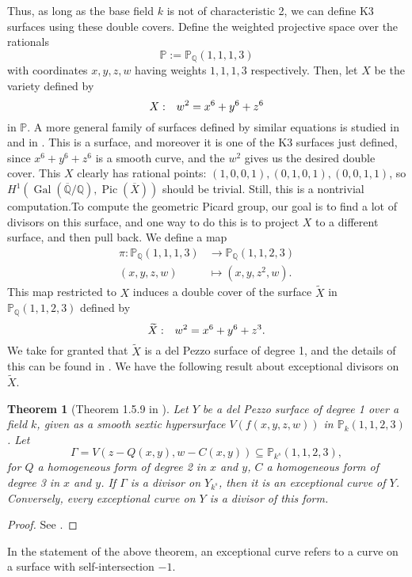 \documentclass[12pt,twoside]{reedthesis}
\theoremstyle{plain}
\newtheorem{theorem}{Theorem}[chapter]
\theoremstyle{definition}
\theoremstyle{remark}
\newcommand{\QQ}{\mathbb{Q}}
\newcommand{\Proj}{\mathbb{P}}
\newcommand{\Pic}{\operatorname{Pic}}
\newcommand{\Gal}{\operatorname{Gal}}
\begin{document}
Thus, as long as the base field $k$ is not of characteristic 2, we can define K3 surfaces using these double covers. Define the weighted projective space over the rationals
\[
\Proj:=\Proj_\QQ(1,1,1,3)
\]
with coordinates $x,y,z,w$ having weights $1,1,1,3$ respectively. Then, let $X$ be the variety defined by 
\[
X:\hspace{0.25cm} w^2=x^6+y^6+z^6
\]
in $\Proj$. A more general family of surfaces defined by similar equations is studied in \cite{mckPaper} and in \cite{festiThesis}. This is a surface, and moreover it is one of the K3 surfaces just defined, since $x^6+y^6+z^6$ is a smooth curve, and the $w^2$ gives us the desired double cover. This $X$ clearly has rational points: $(1,0,0,1), (0,1,0,1), (0,0,1,1)$, so $H^1(\Gal(\overline{\QQ}/\QQ),\Pic(\overline{X}))$ should be trivial. Still, this is a nontrivial computation.To compute the geometric Picard group, our goal is to find a lot of divisors on this surface, and one way to do this is to project $X$ to a different surface, and then pull back. We define a map
\begin{align*}
\pi:\Proj_\QQ(1,1,1,3)&\to\Proj_\QQ(1,1,2,3)\\
(x,y,z,w)&\mapsto(x,y,z^2,w).
\end{align*}
This map restricted to $X$ induces a double cover of the surface $\widetilde{X}$ in $\Proj_\QQ(1,1,2,3)$ defined by
\[
\widetilde{X}:\hspace{0.25cm} w^2=x^6+y^6+z^3.
\]
We take for granted that $\widetilde{X}$ is a del Pezzo surface of degree 1, and the details of this can be found in \cite{tonyThesis}. We have the following result about exceptional divisors on $\widetilde{X}$.
\begin{theorem}[Theorem 1.5.9 in \cite{tonyThesis}]
Let $Y$ be a del Pezzo surface of degree 1 over a field $k$, given as a smooth sextic hypersurface $V(f(x,y,z,w))$ in $\Proj_k(1,1,2,3)$. Let
\[
\Gamma=V(z-Q(x,y),w-C(x,y))\subseteq\Proj_{k^s}(1,1,2,3),
\]
for $Q$ a homogeneous form of degree 2 in $x$ and $y$, $C$ a homogeneous form of degree 3 in $x$ and $y$. If $\Gamma$ is a divisor on $Y_{k^s}$, then it is an exceptional curve of $Y$. Conversely, every exceptional curve on $Y$ is a divisor of this form.
\end{theorem}
\begin{proof}
See \cite[Section 4.1.3]{tonyThesis}.
\end{proof}
\noindent In the statement of the above theorem, an exceptional curve refers to a curve on a surface with self-intersection $-1$.
\end{document}
